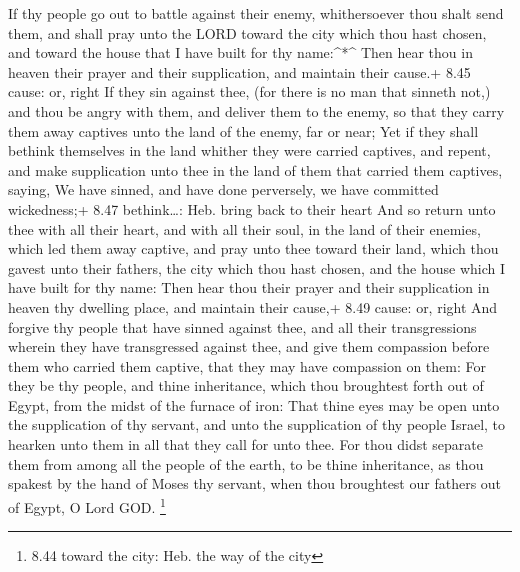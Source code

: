  If thy people go out to battle against their enemy,
whithersoever thou shalt send them, and shall pray unto the LORD toward
the city which thou hast chosen, and toward the house that I have built
for thy name:\^{}*\^{}  Then hear thou in heaven their
prayer and their supplication, and maintain their cause.+ 8.45 cause:
or, right  If they sin against thee, (for there is no man
that sinneth not,) and thou be angry with them, and deliver them to the
enemy, so that they carry them away captives unto the land of the enemy,
far or near;  Yet if they shall bethink themselves in the
land whither they were carried captives, and repent, and make
supplication unto thee in the land of them that carried them captives,
saying, We have sinned, and have done perversely, we have committed
wickedness;+ 8.47 bethink\ldots: Heb. bring back to their heart
 And so return unto thee with all their heart, and with all
their soul, in the land of their enemies, which led them away captive,
and pray unto thee toward their land, which thou gavest unto their
fathers, the city which thou hast chosen, and the house which I have
built for thy name:  Then hear thou their prayer and their
supplication in heaven thy dwelling place, and maintain their cause,+
8.49 cause: or, right  And forgive thy people that have
sinned against thee, and all their transgressions wherein they have
transgressed against thee, and give them compassion before them who
carried them captive, that they may have compassion on them:
 For they be thy people, and thine inheritance, which thou
broughtest forth out of Egypt, from the midst of the furnace of iron:
 That thine eyes may be open unto the supplication of thy
servant, and unto the supplication of thy people Israel, to hearken unto
them in all that they call for unto thee.  For thou didst
separate them from among all the people of the earth, to be thine
inheritance, as thou spakest by the hand of Moses thy servant, when thou
broughtest our fathers out of Egypt, O Lord GOD. \footnote{8.44 toward
  the city: Heb. the way of the city}

